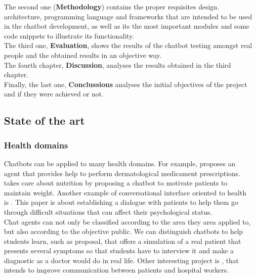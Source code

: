 \documentclass[12pt,english]{article}
\begin{document}
The second one (\textbf{Methodology}) contains the proper requisites design. architecture, programming language and frameworks that are intended to be used in the chatbot development, as well as its the most important modules and some code snippets to illustrate its functionality.\\

The third one, \textbf{Evaluation}, shows the results of the chatbot testing amongst real people and the obtained results in an objective way.\\

The fourth chapter, \textbf{Discussion}, analyses the results obtained in the third chapter.\\

Finally, the last one, \textbf{Conclussions} analyses the initial objectives of the project and if they were achieved or not.



\newpage

\subsection{State of the art}

\subsubsection{Health domains}

Chatbots can be applied to many health domains. For example, \cite{Alesanco2017185} proposes an agent that provides help to perform dermatological medicament prescriptions. \cite{BennetPraba20193470} takes care about nutrition by proposing a chatbot to motivate patients to maintain weight. Another example of conversational interface oriented to health is \cite{Falala-Sechet2019236}. This paper is about establishing a dialogue with patients to help them go through difficult situations that can affect their psychological status.\\

Chat agents can not only be classified according to the area they area applied to, but also according to the objective public. We can distinguish chatbots to help students learn, such as \cite{Lopez2008194} proposal, that offers a simulation of a real patient that presents several symptoms so that students have to interview it and make a diagnostic as a doctor would do in real life. Other interesting project is \cite{Shorey2019e14658}, that intends to improve communication between patients and hospital workers.\\
\end{document}
